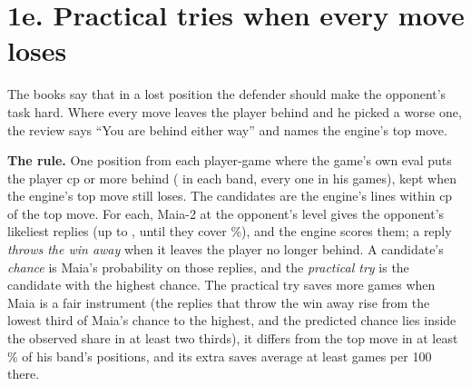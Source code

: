 \documentclass[11pt]{article}
\begin{document}
\begin{table}[h]
\centering
\scriptsize\RetreatsTable
\caption{How often the player missed a must-find best move, by the direction of a quiet best move.
Differences are in points, with Newcombe's interval.}
\label{tab:retreats}
\end{table}

\begin{table}[h]
\centering
\scriptsize\RetreatsMaiaTable
\caption{Maia-2's mean probability for the best move in his band, by the best move's margin over the
second, with the bootstrap interval of the weighted difference.}
\label{tab:retreatsmaia}
\end{table}

\section{1e. Practical tries when every move loses}

The books say that in a lost position the defender should make the opponent's task hard. Where every
move leaves the player behind and he picked a worse one, the review says ``You are behind either
way'' and names the engine's top move.

\textbf{The rule.} One position from each player-game where the game's own eval puts the player
\PracticalBehind{} cp or more behind (\PracticalHisPositions{} in each band, every one in his games),
kept when the engine's top move still loses. The candidates are the engine's lines within
\PracticalWithin{} cp of the top move. For each, Maia-2 at the opponent's level gives the opponent's
likeliest replies (up to \PracticalMost, until they cover \PracticalCover\%), and the engine scores
them; a reply \emph{throws the win away} when it leaves the player no longer behind. A candidate's
\emph{chance} is Maia's probability on those replies, and the \emph{practical try} is the candidate
with the highest chance. The practical try saves more games when Maia is a fair instrument (the
replies that throw the win away rise from the lowest third of Maia's chance to the highest, and the
predicted chance lies inside the observed share in at least two thirds), it differs from the top
move in at least \PracticalDiffersBar\% of his band's positions, and its extra saves average at
least \PracticalExtraBar{} games per 100 there.
\end{document}
